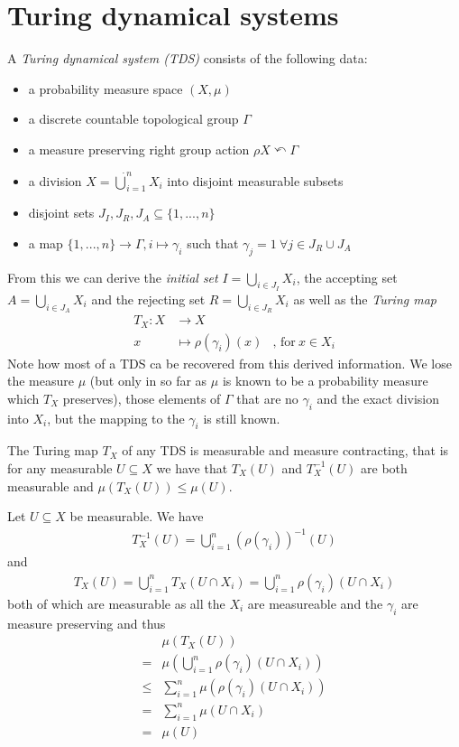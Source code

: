 \section{Turing dynamical systems}

\begin{Definition}
	A \emph{Turing dynamical system (TDS) } consists of the following data:
	\begin{itemize}
		\item{a probability measure space $(X,\mu)$}
		\item{a discrete countable topological group $\Gamma$}
		\item{a measure preserving right group action $\rho X \curvearrowleft \Gamma$}
		\item{a division $X = \dot\bigcup_{i=1}^n X_i$ into disjoint measurable subsets}
		\item{disjoint sets $J_I, J_R, J_A \subseteq \{1,...,n\}$}
		\item{a map $\{1,...,n\} \to \Gamma, i \mapsto \gamma_i$ such that $\gamma_j = 1~\forall j \in J_R \cup J_A$}
	\end{itemize}
\end{Definition}
From this we can derive the \emph{initial set} $I = \bigcup_{i\in J_I} X_i$, the accepting set $A = \bigcup_{i \in J_A} X_i$ and the rejecting set $R = \bigcup_{i \in J_R} X_i$ as well as the \emph{Turing map}
\begin{align*}
	T_X : X &\to X \\
	x &\mapsto \rho(\gamma_i)(x)&\text{, for}~x \in X_i
\end{align*}
Note how most of a TDS ca be recovered from this derived information.
We lose the measure $\mu$ (but only in so far as $\mu$ is known to be a probability measure which $T_X$ preserves),
those elements of $\Gamma$ that are no $\gamma_i$
and the exact division into $X_i$, but the mapping to the $\gamma_i$ is still known.

\begin{Lemma}
	The Turing map $T_X$ of any TDS is measurable and measure contracting, that is for any measurable $U \subseteq X$ we have that $T_X(U)$ and $T_X^{-1}(U)$ are both measurable and $\mu(T_X(U)) \leq \mu(U)$.
\end{Lemma}
\proof
Let $U \subseteq X$ be measurable. We have
\begin{align*}
	T_X^{-1}(U) = \bigcup_{i=1}^n (\rho(\gamma_i))^{-1}(U)
\end{align*}
and
\begin{align*}
	T_X(U) = \bigcup_{i=1}^n T_X(U \cap X_i) = \bigcup_{i=1}^n \rho(\gamma_i)(U \cap X_i)
\end{align*}
both of which are measurable as all the $X_i$ are measureable and the $\gamma_i$ are measure preserving and thus
\begin{align*}
	&\mu(T_X(U)) \\
	= &\mu(\bigcup_{i=1}^n \rho(\gamma_i)(U \cap X_i)) \\
	\leq &\sum_{i=1}^n \mu(\rho(\gamma_i)(U \cap X_i)) \\
	= &\sum_{i=1}^n \mu(U \cap X_i) \\
	= &\mu(U)
\end{align*}
\endproof


